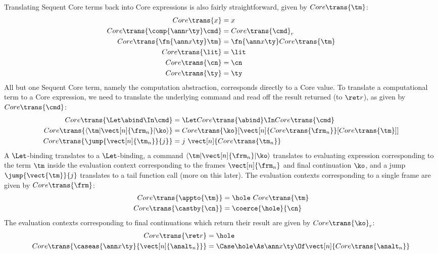 \documentclass{article}
\begin{document}
Translating Sequent Core terms back into Core expressions is also fairly
straightforward, given by $Core\trans{\tm}$:
\begin{align*}
  Core\trans{x} &= x
  \\
  Core\trans{\comp{\ann r \ty} \cmd} &= Core\trans{\cmd}_{r}
  \\
  Core\trans{\fn{\ann x \ty}\tm} &= \fn{\ann x \ty}Core\trans{\tm}
  \\
  Core\trans{\lit} &= \lit
  \\
  Core\trans{\cn} &= \cn
  \\
  Core\trans{\ty} &= \ty
\end{align*}
All but one Sequent Core term, namely the computation abstraction, corresponds
directly to a Core value.  To translate a computational term to a Core
expression, we need to translate the underlying command and read off the result
returned (to $\ret r$), as given by $Core\trans{\cmd}$:
\begin{align*}
  Core\trans{\Let \abind \In \cmd}
  &=
  \Let Core\trans{\abind} \In Core\trans{\cmd}
  \\
  Core\trans{\braket{\tm | \vect[n]{\frm_n} | \ko}}
  &=
  Core\trans{\ko}[\vect[n]{Core\trans{\frm_n}}[Core\trans{\tm}]]
  \\
  Core\trans{\jump{\vect[n]{\tm_n}}{j}}
  &=
  j ~ \vect[n]{Core\trans{\tm_n}}
\end{align*}
A $\Let$-binding translates to a $\Let$-binding, a command
$\braket{\tm|\vect[n]{\frm_n}|\ko}$ translates to evaluating expression
corresponding to the term $\tm$ inside the evaluation context corresponding to
the frames $\vect[n]{\frm_n}$ and final continuation $\ko$, and a jump
$\jump{\vect{\tm}}{j}$ translates to a tail function call (more on this later).
The evaluation contexts corresponding to a single frame are given by
$Core\trans{\frm}$:
\begin{align*}
  Core\trans{\appto{\tm}} &= \hole ~ Core\trans{\tm}
  \\
  Core \trans{\castby{\cn}} &= \coerce{\hole}{\cn}
\end{align*}
The evaluation contexts corresponding to final continuations which return their
result are given by $Core\trans{\ko}_{r}$:
\begin{align*}
  Core\trans{\ret r} &= \hole
  \\
  Core\trans{\caseas{\ann x \ty}{\vect[n]{\analt_n}}}
  &=
  \Case \hole \As \ann x \ty \Of \vect[n]{Core\trans{\analt_n}}
\end{align*}
\end{document}
